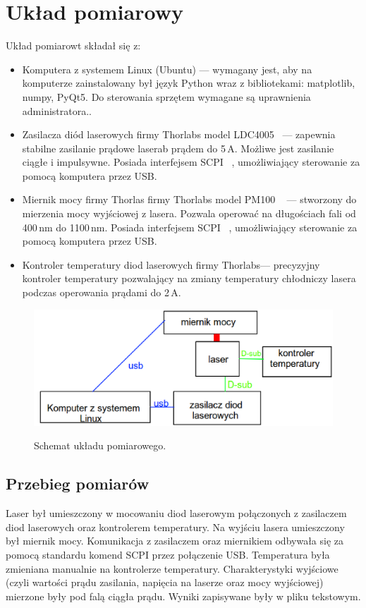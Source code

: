 \section{Układ pomiarowy}
Układ pomiarowt składał się z:
\begin{itemize}
\item Komputera z systemem Linux (Ubuntu) --- wymagany jest, aby na komputerze zainstalowany był język Python wraz z bibliotekami:
matplotlib, numpy, PyQt5. Do sterowania sprzętem wymagane są uprawnienia administratora..
\item Zasilacza diód laserowych firmy Thorlabs model LDC4005 ~\cite{Ldc_book}--- zapewnia stabilne zasilanie prądowe laserab prądem do 5\,A.
Możliwe jest zasilanie ciągłe i impulsywne. Posiada interfejsem SCPI ~\cite{Ldc_book_prog}, umożliwiający sterowanie za pomocą komputera przez USB.
\item Miernik mocy firmy Thorlas firmy Thorlabs model PM100 ~\cite{Pm100_book} --- stworzony do mierzenia mocy wyjściowej z lasera. Pozwala operować na
długościach fali od 400\,nm do 1100\,nm. Posiada interfejsem SCPI ~\cite{Pm100_book}, umożliwiający sterowanie za pomocą komputera przez USB.
\item Kontroler temperatury diod laserowych firmy Thorlabs--- precyzyjny kontroler temperatury pozwalający na zmiany temperatury
chłodniczy lasera podczas operowania prądami do 2\,A.
\end{itemize}
\begin{figure}
\center
  \includegraphics[scale=0.35]{schemat.eps}
  \label{rys1}
  \caption{Schemat układu pomiarowego.}
\end{figure}
\subsection{Przebieg pomiarów}
Laser był umieszczony w mocowaniu diod laserowym połączonych z zasilaczem diod laserowych oraz kontrolerem temperatury.
Na wyjściu lasera umieszczony był miernik mocy. Komunikacja z zasilaczem oraz miernikiem odbywała się za pomocą standardu
komend SCPI przez połączenie USB. Temperatura była zmieniana manualnie na kontrolerze temperatury.
Charakterystyki wyjściowe (czyli wartości prądu zasilania, napięcia na laserze oraz mocy wyjściowej)
mierzone były pod falą ciągła prądu. Wyniki zapisywane były w pliku tekstowym.
